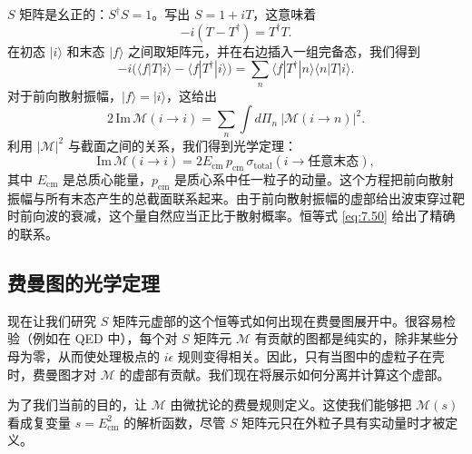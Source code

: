 $S$ 矩阵是幺正的：$S^{\dagger}S = 1$。写出 $S = 1+iT$，这意味着
\begin{equation}
  -i(T - T^{\dagger}) = T^{\dagger}T .
\end{equation}
在初态 $|i\rangle$ 和末态 $|f\rangle$ 之间取矩阵元，并在右边插入一组完备态，我们得到
\begin{equation}
  -i\bigl( \langle f|T|i\rangle - \langle f|T^{\dagger}|i\rangle \bigr)
  = \sum_n \langle f|T^{\dagger}|n\rangle\langle n|T|i\rangle .
\end{equation}
对于前向散射振幅，$|f\rangle = |i\rangle$，这给出
\begin{equation}
  2\,\mathrm{Im}\,\mathcal{M}(i\to i)
  = \sum_n \int d\Pi_n\ |\mathcal{M}(i\to n)|^2 .
  \label{eq:7.49}
\end{equation}
利用 $|\mathcal{M}|^2$ 与截面之间的关系，我们得到光学定理：
\begin{equation}
  \mathrm{Im}\,\mathcal{M}(i\to i) = 2E_{\mathrm{cm}}\,p_{\mathrm{cm}}\,
    \sigma_{\mathrm{total}}(i\to\text{任意末态}),
  \label{eq:7.50}
\end{equation}
其中 $E_{\mathrm{cm}}$ 是总质心能量，$p_{\mathrm{cm}}$ 是质心系中任一粒子的动量。这个方程把前向散射振幅与所有末态产生的总截面联系起来。由于前向散射振幅的虚部给出波束穿过靶时前向波的衰减，这个量自然应当正比于散射概率。恒等式 \eqref{eq:7.50} 给出了精确的联系。

\subsection{费曼图的光学定理}

现在让我们研究 $S$ 矩阵元虚部的这个恒等式如何出现在费曼图展开中。很容易检验（例如在 QED 中），每个对 $S$ 矩阵元 $\mathcal{M}$ 有贡献的图都是纯实的，除非某些分母为零，从而使处理极点的 $i\epsilon$ 规则变得相关。因此，只有当图中的虚粒子在壳时，费曼图才对 $\mathcal{M}$ 的虚部有贡献。我们现在将展示如何分离并计算这个虚部。

为了我们当前的目的，让 $\mathcal{M}$ 由微扰论的费曼规则定义。这使我们能够把 $\mathcal{M}(s)$ 看成复变量 $s = E^2_{\mathrm{cm}}$ 的解析函数，尽管 $S$ 矩阵元只在外粒子具有实动量时才被定义。

